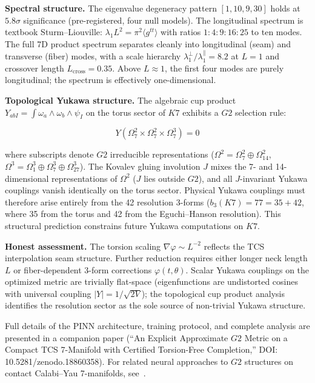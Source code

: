 \documentclass[11pt,a4paper]{article}
\newcommand{\Gtwo}{\mathrm{G}_2}
\newcommand{\Kseven}{K_7}
\def\Gtwo{G2}%
\def\Kseven{K7}%
\begin{document}
\textbf{Spectral structure.} The eigenvalue degeneracy pattern $[1, 10, 9, 30]$ holds at $5.8\sigma$ significance (pre-registered, four null models). The longitudinal spectrum is textbook Sturm--Liouville: $\lambda_1 L^2 = \pi^2\langle g^{tt}\rangle$ with ratios $1:4:9:16:25$ to ten modes. The full 7D product spectrum separates cleanly into longitudinal (seam) and transverse (fiber) modes, with a scale hierarchy $\lambda_1^\perp/\lambda_1^\parallel = 8.2$ at $L = 1$ and crossover length $L_{\mathrm{cross}} = 0.35$. Above $L \approx 1$, the first four modes are purely longitudinal; the spectrum is effectively one-dimensional.

\textbf{Topological Yukawa structure.} The algebraic cup product $Y_{abI} = \int \omega_a \wedge \omega_b \wedge \psi_I$ on the torus sector of $\Kseven$ exhibits a $\Gtwo$ selection rule:

$$Y(\Omega^2_7 \times \Omega^2_7 \times \Omega^3_7) = 0$$

where subscripts denote $\Gtwo$ irreducible representations ($\Omega^2 = \Omega^2_7 \oplus \Omega^2_{14}$, $\Omega^3 = \Omega^3_1 \oplus \Omega^3_7 \oplus \Omega^3_{27}$). The Kovalev gluing involution $J$ mixes the 7- and 14-dimensional representations of $\Omega^2$ ($J$ lies outside $\Gtwo$), and all $J$-invariant Yukawa couplings vanish identically on the torus sector. Physical Yukawa couplings must therefore arise entirely from the 42 resolution 3-forms ($b_3(\Kseven) = 77 = 35 + 42$, where 35 from the torus and 42 from the Eguchi--Hanson resolution). This structural prediction constrains future Yukawa computations on $\Kseven$.

\textbf{Honest assessment.} The torsion scaling $\nabla\varphi \sim L^{-2}$ reflects the TCS interpolation seam structure. Further reduction requires either longer neck length $L$ or fiber-dependent 3-form corrections $\varphi(t,\theta)$. Scalar Yukawa couplings on the optimized metric are trivially flat-space (eigenfunctions are undistorted cosines with universal coupling $|Y| = 1/\sqrt{2V}$); the topological cup product analysis identifies the resolution sector as the sole source of non-trivial Yukawa structure.

Full details of the PINN architecture, training protocol, and complete analysis are presented in a companion paper (``An Explicit Approximate $\Gtwo$ Metric on a Compact TCS 7-Manifold with Certified Torsion-Free Completion,'' DOI: 10.5281/zenodo.18860358). For related neural approaches to $\Gtwo$ structures on contact Calabi--Yau 7-manifolds, see~\cite{heyes2025}.
\end{document}
